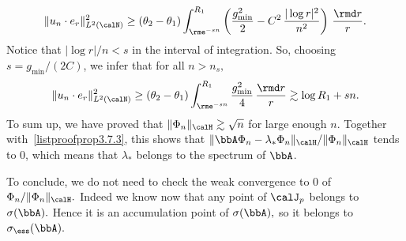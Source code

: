 \begin{proofc}
\begin{step}
\[
\| u_n\cdot e_r \|_{L^2(\calN)}^2
\geq (\theta_2-\theta_1) \int_{\rme^{-sn}}^{R_1}
\left(\frac{g_{\min}^2}{2} - C^2\,\frac{|\log r|^2}{n^2} \right)\,\frac{\rmd r}{r}.
\]
Notice that $|\log r|/n < s$ in the interval of integration. So, choosing $s = g_{\min}/(2C)$, we infer that for all $n > n_s,$
\[
\| u_n\cdot e_r \|_{L^2(\calN)}^2
\geq (\theta_2-\theta_1) \int_{\rme^{-s n}}^{R_1}
\frac{g_{\min}^2}{4}\,\frac{\rmd r}{r}
\gtrsim \log R_1 + s n.
\]
To sum up, we have proved that $\| \Phi_n \|_\calH \gtrsim \sqrt{n}$ for large enough $n.$ Together with~\eqref{listproofprop3.7.3}, this shows that $\|\bbA \Phi_n - \lambda_* \Phi_n\|_\calH/\|\Phi_n\|_\calH$ tends to $0$, which means that $\lambda_*$ belongs to the spectrum of $\bbA$.

To conclude, we do not need to check the weak convergence to 0 of $\Phi_n/\|\Phi_n\|_\calH.$ Indeed we know now that any point of $\calJ_p$ belongs to $\sigma(\bbA).$ Hence it is an accumulation point of $\sigma(\bbA),$ so it belongs to $\sigma_{\ess}(\bbA).$
\end{step}
\qedhere
\end{proofc}


